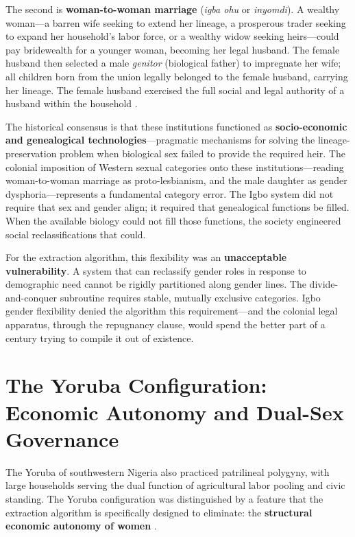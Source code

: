 The second is \textbf{woman-to-woman marriage} (\textit{igba ohu} or \textit{inyomdi}). A wealthy woman---a barren wife seeking to extend her lineage, a prosperous trader seeking to expand her household's labor force, or a wealthy widow seeking heirs---could pay bridewealth for a younger woman, becoming her legal husband. The female husband then selected a male \textit{genitor} (biological father) to impregnate her wife; all children born from the union legally belonged to the female husband, carrying her lineage. The female husband exercised the full social and legal authority of a husband within the household \cite{w2w_oxford}.

The historical consensus is that these institutions functioned as \textbf{socio-economic and genealogical technologies}---pragmatic mechanisms for solving the lineage-preservation problem when biological sex failed to provide the required heir. The colonial imposition of Western sexual categories onto these institutions---reading woman-to-woman marriage as proto-lesbianism, and the male daughter as gender dysphoria---represents a fundamental category error. The Igbo system did not require that sex and gender align; it required that genealogical functions be filled. When the available biology could not fill those functions, the society engineered social reclassifications that could.

For the extraction algorithm, this flexibility was an \textbf{unacceptable vulnerability}. A system that can reclassify gender roles in response to demographic need cannot be rigidly partitioned along gender lines. The divide-and-conquer subroutine requires stable, mutually exclusive categories. Igbo gender flexibility denied the algorithm this requirement---and the colonial legal apparatus, through the repugnancy clause, would spend the better part of a century trying to compile it out of existence.

\section{The Yoruba Configuration: Economic Autonomy and Dual-Sex Governance}
\label{sec:yoruba}

The Yoruba of southwestern Nigeria also practiced patrilineal polygyny, with large households serving the dual function of agricultural labor pooling and civic standing. The Yoruba configuration was distinguished by a feature that the extraction algorithm is specifically designed to eliminate: the \textbf{structural economic autonomy of women} \cite{colonial_yoruba}.

